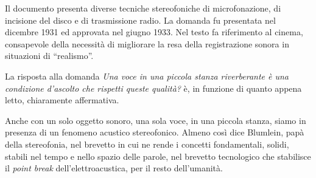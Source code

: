 Il documento presenta diverse tecniche stereofoniche di microfonazione, di
incisione del disco e di trasmissione radio. La domanda fu presentata nel
dicembre 1931 ed approvata nel giugno 1933. Nel testo fa riferimento al cinema,
consapevole della necessità di migliorare la resa della registrazione sonora
in situazioni di “realismo”.

La risposta alla domanda \emph{Una voce in una piccola stanza riverberante è una
condizione d'ascolto che rispetti queste qualità?} è, in funzione di quanto
appena letto, chiaramente affermativa.

Anche con un solo oggetto sonoro, una sola voce, in una piccola stanza, siamo in
presenza di un fenomeno acustico stereofonico. Almeno così dice Blumlein, papà
della stereofonia, nel brevetto in cui ne rende i concetti fondamentali, solidi,
stabili nel tempo e nello spazio delle parole, nel brevetto tecnologico che stabilisce
il \emph{point break} dell'elettroacustica, per il resto dell'umanità.
